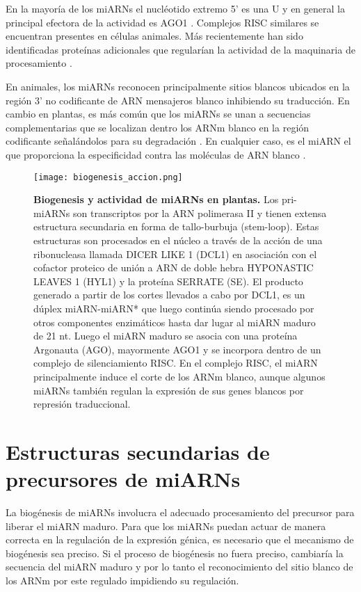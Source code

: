 En la mayoría de los miARNs el nucléotido extremo 5' es una U y en general la principal efectora de la actividad es AGO1 \citep{Voinnet2009669,pmid18342361,Vazquez2004a}.
Complejos RISC similares se encuentran presentes en células animales.
Más recientemente han sido identificadas proteínas adicionales que regularían la actividad de la maquinaria de procesamiento \citep{Bologna11112012}.

En animales, los miARNs reconocen principalmente sitios blancos ubicados en la región 3' no codificante de ARN mensajeros blanco inhibiendo su traducción.
En cambio en plantas, es más común que los miARNs se unan a secuencias complementarias que se localizan dentro los ARNm blanco en la región codificante señalándolos para su degradación \citep{Jones-Rhoades2006}.
En cualquier caso, es el miARN el que proporciona la especificidad contra las moléculas de ARN blanco \citep{Bartel2004}.

\begin{figure}[htbp!] 
    \centering    
    \texttt{[image: biogenesis\_accion.png]}
    \caption[Biogénesis y actividad de los miARNs en plantas]{
    \textbf{Biogenesis y actividad de miARNs en plantas.}
    Los pri-miARNs son transcriptos por la ARN polimerasa II y tienen extensa estructura secundaria en forma de tallo-burbuja (stem-loop).
    Estas estructuras son procesados en el núcleo a través de la acción de una ribonucleasa llamada DICER LIKE 1 (DCL1) en asociación con el cofactor proteico de unión a ARN de doble hebra HYPONASTIC LEAVES 1 (HYL1) y la proteína SERRATE (SE).
    El producto generado a partir de los cortes llevados a cabo por DCL1, es un dúplex miARN-miARN* que luego continúa siendo procesado por otros componentes enzimáticos hasta dar lugar al miARN maduro de 21 nt.
    Luego el miARN maduro se asocia con una proteína Argonauta (AGO), mayormente AGO1 y se incorpora dentro de un complejo de silenciamiento RISC.
    En el complejo RISC, el miARN principalmente induce el corte de los ARNm blanco, aunque algunos miARNs también regulan la expresión de sus genes blancos por represión traduccional.
    }
    \label{fig:biogenesis_accion}
\end{figure}


\section{Estructuras secundarias de precursores de miARNs}

La biogénesis de miARNs involucra el adecuado procesamiento del precursor para liberar el miARN maduro.
Para que los miARNs puedan actuar de manera correcta en la regulación de la expresión génica, es necesario que el mecanismo de biogénesis sea preciso.
Si el proceso de biogénesis no fuera preciso, cambiaría la secuencia del miARN maduro y por lo tanto el reconocimiento del sitio blanco de los ARNm por este regulado impidiendo su regulación.

